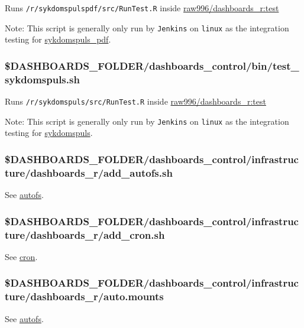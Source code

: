 \documentclass[12pt,]{article}
\begin{document}
Runs \texttt{/r/sykdomspulspdf/src/RunTest.R} inside
\href{https://github.com/raubreywhite/dashboards_control/blob/master/infrastructure/dashboards_r/Dockerfile}{raw996/dashboards\_r:test}

Note: This script is generally only run by \texttt{Jenkins} on
\texttt{linux} as the integration testing for
\href{https://folkehelseinstituttet.github.io/dashboards_sykdomspuls_pdf/}{sykdomspuls\_pdf}.

\subsubsection{\$DASHBOARDS\_FOLDER/dashboards\_control/bin/test\_sykdomspuls.sh}\label{dashboards_folderdashboards_controlbintest_sykdomspuls.sh}

Runs \texttt{/r/sykdomspuls/src/RunTest.R} inside
\href{https://github.com/raubreywhite/dashboards_control/blob/master/infrastructure/dashboards_r/Dockerfile}{raw996/dashboards\_r:test}

Note: This script is generally only run by \texttt{Jenkins} on
\texttt{linux} as the integration testing for
\href{https://folkehelseinstituttet.github.io/dashboards_sykdomspuls/}{sykdomspuls}.

\subsubsection{\$DASHBOARDS\_FOLDER/dashboards\_control/infrastructure/dashboards\_r/add\_autofs.sh}\label{dashboards_folderdashboards_controlinfrastructuredashboards_radd_autofs.sh}

See \protect\hyperlink{autofs}{autofs}.

\subsubsection{\$DASHBOARDS\_FOLDER/dashboards\_control/infrastructure/dashboards\_r/add\_cron.sh}\label{dashboards_folderdashboards_controlinfrastructuredashboards_radd_cron.sh}

See \protect\hyperlink{cron}{cron}.

\subsubsection{\$DASHBOARDS\_FOLDER/dashboards\_control/infrastructure/dashboards\_r/auto.mounts}\label{dashboards_folderdashboards_controlinfrastructuredashboards_rauto.mounts}

See \protect\hyperlink{autofs}{autofs}.
\end{document}
